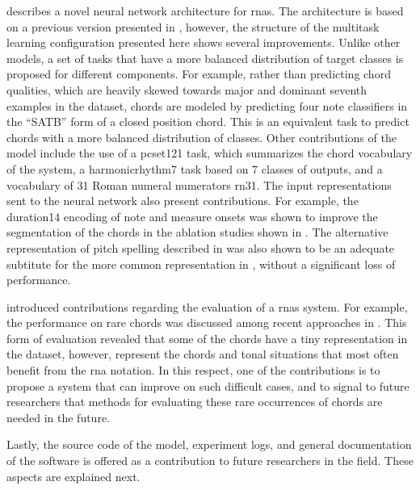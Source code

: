  describes a novel neural network
architecture for \glspl{rna}. The architecture is based on a
previous version presented in
\textcite{napoleslopez2021augmentednet}, however, the
structure of the multitask learning configuration presented
here shows several improvements. Unlike other models, a set
of tasks that have a more balanced distribution of target
classes is proposed for different components. For example,
rather than predicting chord qualities, which are heavily
skewed towards major and dominant seventh examples in the
dataset, chords are modeled by predicting four note
classifiers in the ``SATB'' form of a closed position chord.
This is an equivalent task to predict chords with a more
balanced distribution of classes. Other contributions of the
model include the use of a \gls{pcset121} task, which
summarizes the chord vocabulary of the system, a
\gls{harmonicrhythm7} task based on 7 classes of outputs,
and a vocabulary of 31 Roman numeral numerators \gls{rn31}.
The input representations sent to the neural network also
present contributions. For example, the \gls{duration14}
encoding of note and measure onsets was shown to improve the
segmentation of the chords in the ablation studies shown in
. The alternative
representation of pitch spelling described in
 was also shown to be an
adequate subtitute for the more common representation in
, without a significant loss
of performance.

 introduced contributions
regarding the evaluation of a \glspl{rna} system. For
example, the performance on rare chords was discussed among
recent approaches in . This
form of evaluation revealed that some of the chords have a
tiny representation in the dataset, however, represent the
chords and tonal situations that most often benefit from the
\gls{rna} notation. In this respect, one of the
contributions is to propose a system that can improve on
such difficult cases, and to signal to future researchers
that methods for evaluating these rare occurrences of chords
are needed in the future.

Lastly, the source code of the model, experiment logs, and
general documentation of the software is offered as a
contribution to future researchers in the field. These
aspects are explained next.
